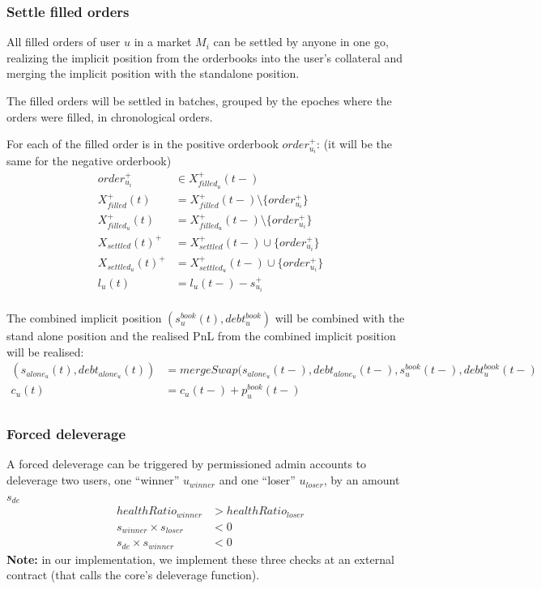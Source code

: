 \documentclass{article}%
\begin{document}
\subsubsection{Settle filled orders}
All filled orders of user $u$ in a market $M_i$ can be settled by anyone in one go, realizing the implicit position from the orderbooks into the user's collateral and merging the implicit position with the standalone position.

The filled orders will be settled in batches, grouped by the epoches where the orders were filled, in chronological orders.

For each of the filled order is in the positive orderbook $order_{u_i}^+$: (it will be the same for the negative orderbook)
    \begin{align*}
        order_{u_i}^+ &\in X_{filled_{u}}^+(t-) \\
        X_{filled}^+(t) &= X_{filled}^+(t-) \setminus \{ order_{u_i}^+ \}\\
        X_{filled_{u}}^+(t) &= X_{filled_{u}}^+(t-) \setminus \{ order_{u_i}^+ \}\\
        X_{settled}(t)^+ &= X_{settled}^+(t-) \cup \{ order_{u_i}^+ \}\\
        X_{settled_{u}}(t)^+ &= X_{settled_{u}}^+(t-) \cup \{ order_{u_i}^+ \}\\
        l_u(t) &= l_u(t-) - s_{u_i}^+\\
    \end{align*}

The combined implicit position $(s_u^{book}(t), debt_u^{book})$ will be combined with the stand alone position and the realised PnL from the combined implicit position will be realised:
    \begin{align*}        
        (s_{alone_{u}}(t), debt_{alone_{u}}(t)) &= mergeSwap( s_{alone_{u}}(t-), debt_{alone_{u}}(t-), s_u^{book}(t-), debt_u^{book}(t-)\\
        c_u(t) &= c_u(t-) + p_u^{book}(t-)\\
    \end{align*}

\subsubsection{Forced deleverage}
A forced deleverage can be triggered by permissioned admin accounts to deleverage two users, one ``winner'' $u_{winner}$ and one ``loser'' $u_{loser}$, by an amount $s_{de}$
    \begin{align*}
        healthRatio_{winner} &> healthRatio_{loser}\\
        s_{winner} \times s_{loser} &< 0\\
        s_{de} \times s_{winner} &< 0
    \end{align*}
\textbf{Note:} in our implementation, we implement these three checks at an external contract (that calls the core's deleverage function).
\end{document}
